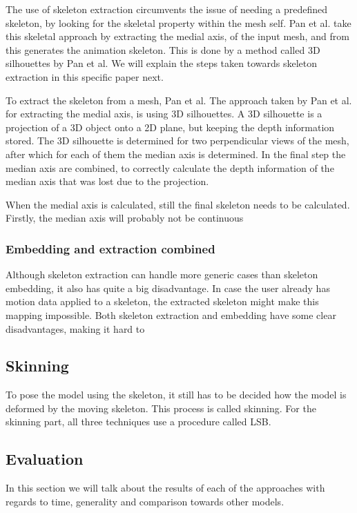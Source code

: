 \documentclass{article}
\begin{document}
The use of skeleton extraction circumvents the issue of needing a predefined skeleton, by looking for the skeletal property within the mesh self. Pan et al. \citep{paper2} take this skeletal approach by extracting the medial axis, of the input mesh, and from this generates the animation skeleton. This is done by a method called 3D silhouettes by Pan et al. We will explain the steps taken towards skeleton extraction in this specific paper next.

To extract the skeleton from a mesh, Pan et al. 
The approach taken by Pan et al. for extracting the medial axis, is using 3D silhouettes. A 3D silhouette is a projection of a 3D object onto a 2D plane, but keeping the depth information stored. The 3D silhouette is determined for two perpendicular views of the mesh, after which for each of them the median axis is determined. In the final step the median axis are combined, to correctly calculate the depth information of the median axis that was lost due to the projection.

When the medial axis is calculated, still the final skeleton needs to be calculated. Firstly, the median axis will probably not be continuous 




\subsubsection{Embedding and extraction combined}
Although skeleton extraction can handle more generic cases than skeleton embedding, it also has quite a big disadvantage. In case the user already has motion data applied to a skeleton, 
the extracted skeleton might make this mapping impossible.
Both skeleton extraction and embedding have some clear disadvantages, making it hard to 


\subsection{Skinning}
To pose the model using the skeleton, it still has to be decided how the model is deformed by the moving skeleton. This process is called skinning. For the skinning part, all three techniques use a procedure called LSB.


\subsection{Evaluation}
In this section we will talk about the results of each of the approaches with regards to time, generality and comparison towards other models.
\end{document}
